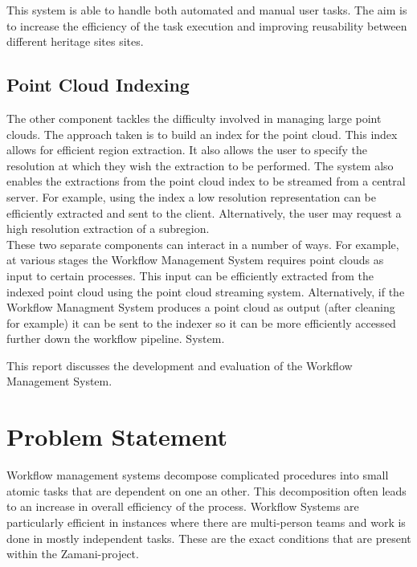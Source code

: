         This system is able to handle both automated and manual user tasks. The
        aim is to increase the efficiency of the task execution and improving
        reusability between different heritage sites sites.

    \subsection{Point Cloud Indexing}
        The other component tackles the difficulty involved in managing large
        point clouds. The approach taken is to build an index for the point cloud. This index
        allows for efficient region extraction. It also allows the user to specify the resolution at which
        they wish the extraction to be performed.
        The system also enables the extractions from the point cloud index to
        be streamed from a central server. For example, using the index a low resolution
        representation can be efficiently extracted and sent to the client. Alternatively, the user may request
        a high resolution extraction of a subregion.
\\

    \noindent These two separate components can interact in a number of ways. For
        example, at various
        stages the Workflow Management System requires point clouds as input
        to certain processes.
        This input can be efficiently extracted from the indexed point cloud
        using the point cloud
        streaming system. Alternatively, if the Workflow Managment System
        produces a point cloud
        as output (after cleaning for example) it can be sent to the indexer
        so it can be more efficiently
        accessed further down the workflow pipeline. System.

    This report discusses the development and evaluation of the Workflow Management System.

\section{Problem Statement}

    Workflow management systems decompose complicated procedures into small atomic tasks
    that are dependent on one an other\cite{Taylor:2006:WES:1196459}. This decomposition
    often leads to an increase in overall efficiency of the process. Workflow Systems
    are particularly efficient in instances where there are multi-person teams and work
    is done in mostly independent tasks. These are the exact conditions that
    are present within the Zamani-project.

